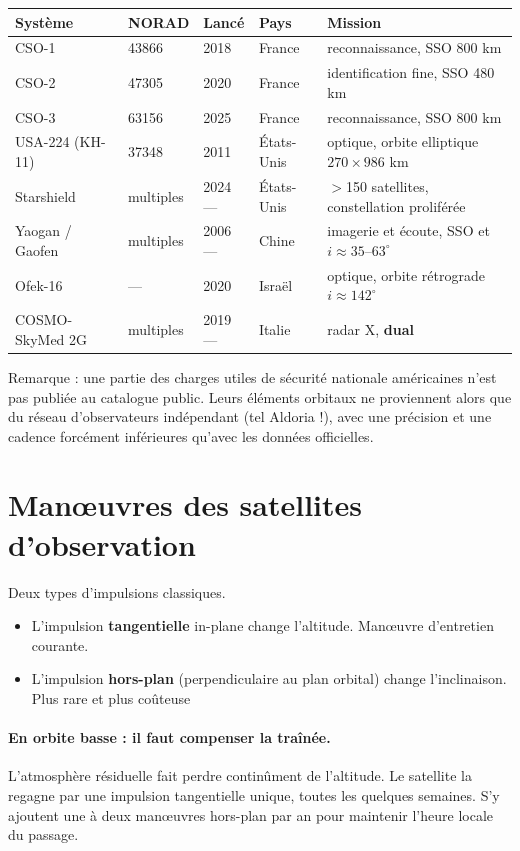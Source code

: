 \documentclass[11pt]{article}
\begin{document}
\begin{center}
\footnotesize\setlength{\tabcolsep}{4pt}
\begin{tabular}{lllll}
\toprule
Système & NORAD & Lancé & Pays & Mission \\
\midrule
CSO-1 & 43866 & 2018 & France & reconnaissance, SSO 800 km \\
CSO-2 & 47305 & 2020 & France & identification fine, SSO 480 km \\
CSO-3 & 63156 & 2025 & France & reconnaissance, SSO 800 km \\
USA-224 (KH-11) & 37348 & 2011 & États-Unis & optique, orbite elliptique $270\times986$ km \\
Starshield & multiples & 2024--- & États-Unis & $>$150 satellites, constellation proliférée \\
Yaogan / Gaofen & multiples & 2006--- & Chine & imagerie et écoute, SSO et $i \approx 35$--$63^\circ$ \\
Ofek-16 & --- & 2020 & Israël & optique, orbite rétrograde $i \approx 142^\circ$ \\
COSMO-SkyMed 2G & multiples & 2019--- & Italie & radar X, \textbf{dual} \\
\bottomrule
\end{tabular}
\end{center}

\noindent Remarque : une partie des charges utiles de sécurité nationale américaines n'est pas publiée au catalogue public. 
Leurs éléments orbitaux ne proviennent alors que du réseau d'observateurs indépendant (tel Aldoria !), avec une précision et une cadence forcément inférieures qu'avec les données officielles.

\section{Manœuvres des satellites d'observation}

Deux types d'impulsions classiques.

\begin{itemize}
  \item L'impulsion \textbf{tangentielle} in-plane change l'altitude. Manœuvre d'entretien courante.
  \item L'impulsion \textbf{hors-plan} (perpendiculaire au plan orbital) change l'inclinaison.  Plus rare et plus coûteuse
\end{itemize}


\paragraph{En orbite basse : il faut compenser la traînée.} L'atmosphère résiduelle fait perdre continûment de l'altitude. Le satellite la regagne par une impulsion tangentielle unique, toutes les quelques semaines. S'y ajoutent une à deux manœuvres hors-plan par an pour maintenir l'heure locale du passage.
\end{document}
